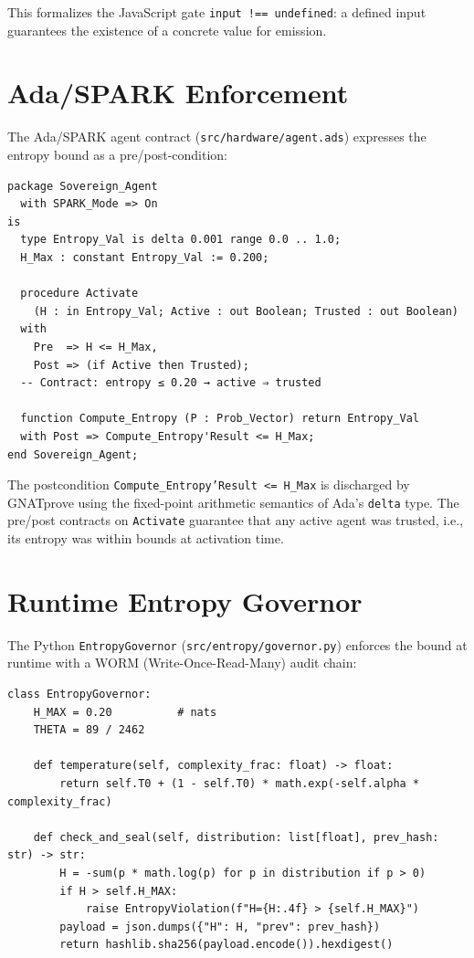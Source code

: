 \documentclass[sigconf,natbib=false]{acmart}
\begin{document}
This formalizes the JavaScript gate \texttt{input !== undefined}: a defined
input guarantees the existence of a concrete value for emission.


\section{Ada/SPARK Enforcement}
\label{sec:spark}

The Ada/SPARK agent contract (\texttt{src/hardware/agent.ads}) expresses the
entropy bound as a pre/post-condition:

\begin{lstlisting}[style=ada,caption={Ada/SPARK agent contract (excerpt)}]
package Sovereign_Agent
  with SPARK_Mode => On
is
  type Entropy_Val is delta 0.001 range 0.0 .. 1.0;
  H_Max : constant Entropy_Val := 0.200;

  procedure Activate
    (H : in Entropy_Val; Active : out Boolean; Trusted : out Boolean)
  with
    Pre  => H <= H_Max,
    Post => (if Active then Trusted);
  -- Contract: entropy ≤ 0.20 → active ⇒ trusted

  function Compute_Entropy (P : Prob_Vector) return Entropy_Val
  with Post => Compute_Entropy'Result <= H_Max;
end Sovereign_Agent;
\end{lstlisting}

The postcondition \texttt{Compute\_Entropy'Result <= H\_Max} is discharged by
GNATprove using the fixed-point arithmetic semantics of Ada's \texttt{delta}
type. The pre/post contracts on \texttt{Activate} guarantee that any active
agent was trusted, i.e., its entropy was within bounds at activation time.


\section{Runtime Entropy Governor}
\label{sec:governor}

The Python \texttt{EntropyGovernor} (\texttt{src/entropy/governor.py}) enforces
the bound at runtime with a WORM (Write-Once-Read-Many) audit chain:

\begin{lstlisting}[style=python,caption={EntropyGovernor (excerpt)}]
class EntropyGovernor:
    H_MAX = 0.20          # nats
    THETA = 89 / 2462

    def temperature(self, complexity_frac: float) -> float:
        return self.T0 + (1 - self.T0) * math.exp(-self.alpha * complexity_frac)

    def check_and_seal(self, distribution: list[float], prev_hash: str) -> str:
        H = -sum(p * math.log(p) for p in distribution if p > 0)
        if H > self.H_MAX:
            raise EntropyViolation(f"H={H:.4f} > {self.H_MAX}")
        payload = json.dumps({"H": H, "prev": prev_hash})
        return hashlib.sha256(payload.encode()).hexdigest()
\end{lstlisting}
\end{document}
